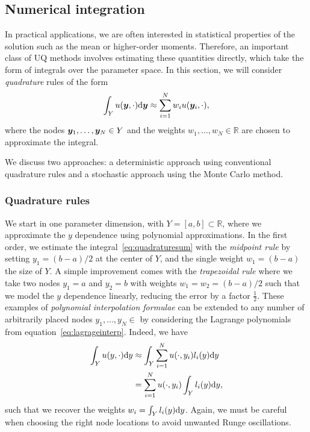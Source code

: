 \subsection{Numerical integration}\label{subsec:computing-integrals}
In practical applications, we are often interested in statistical properties of the solution such as the mean or higher-order moments.
Therefore, an important class of UQ methods involves estimating these quantities directly, which take the form of integrals over the parameter space.
In this section, we will consider \emph{quadrature} rules of the form
\begin{equation}
    \int_Y u({\bm{y}}, \cdot) \mathrm{d}{\bm{y}} \approx \sum_{i=1}^N w_i u({\bm{y}_i},\cdot)\label{eq:quadraturesum},
\end{equation}
where the nodes ${\bm{y}}_1,\ldots,{\bm{y}}_N\in Y$ and the weights $w_1,\ldots, w_N \in \mathbb{R}$ are chosen to approximate the integral.

We discuss two approaches: a deterministic approach using conventional quadrature rules and a stochastic approach using the Monte Carlo method.
\subsubsection{Quadrature rules}
We start in one parameter dimension, with $Y=[a,b]\subset \mathbb{R}$, where we approximate the $y$ dependence using polynomial approximations.
In the first order, we estimate the integral~\eqref{eq:quadraturesum} with the \emph{midpoint rule} by setting $y_1=(b-a)/2$ at the center of $Y$, and the single weight $w_1 = (b-a)$ the size of $Y$.
A simple improvement comes with the \emph{trapezoidal rule} where we take two nodes $y_1=a$ and $y_2=b$ with weights $w_1=w_2=(b-a)/2$ such that we model the $y$ dependence linearly, reducing the error by a factor $\frac{1}{2}$.
These examples of \emph{polynomial interpolation formulae} can be extended to any number of arbitrarily placed nodes $y_1,\ldots,y_N\in $ by considering the Lagrange polynomials from equation~\eqref{eq:lagrageinterp}.
Indeed, we have
\begin{align*}
    \int_Y u(y,\cdot) \mathrm{d} y &\approx \int_Y \sum_{i=1}^N u(\cdot,y_i) l_i(y) \mathrm{d} y\\
    &= \sum_{i=1}^N u(\cdot,y_i) \int_Y l_i(y) \mathrm{d} y,
\end{align*}
such that we recover the weights $w_i=\int_Y l_i(y) \mathrm{d} y$.
Again, we must be careful when choosing the right node locations to avoid unwanted Runge oscillations.

